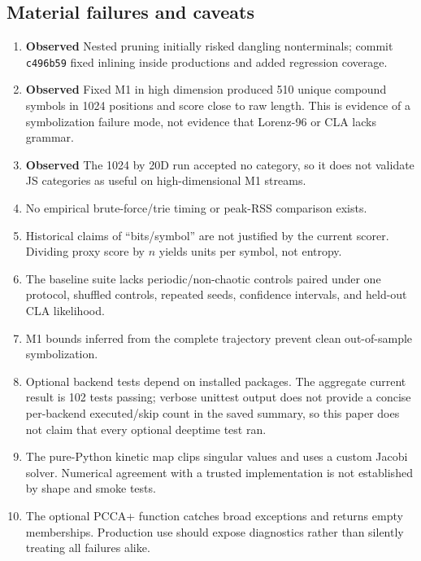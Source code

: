 \documentclass[11pt]{article}
\newcommand{\Observed}{\textbf{Observed}}
\begin{document}
\subsection{Material failures and caveats}
\begin{enumerate}[leftmargin=*]
\item \Observed{} Nested pruning initially risked dangling nonterminals; commit \texttt{c496b59} fixed inlining inside productions and added regression coverage.
\item \Observed{} Fixed M1 in high dimension produced 510 unique compound symbols in 1024 positions and score close to raw length. This is evidence of a symbolization failure mode, not evidence that Lorenz-96 or CLA lacks grammar.
\item \Observed{} The 1024 by 20D run accepted no category, so it does not validate JS categories as useful on high-dimensional M1 streams.
\item No empirical brute-force/trie timing or peak-RSS comparison exists.
\item Historical claims of ``bits/symbol'' are not justified by the current scorer. Dividing proxy score by $n$ yields units per symbol, not entropy.
\item The baseline suite lacks periodic/non-chaotic controls paired under one protocol, shuffled controls, repeated seeds, confidence intervals, and held-out CLA likelihood.
\item M1 bounds inferred from the complete trajectory prevent clean out-of-sample symbolization.
\item Optional backend tests depend on installed packages. The aggregate current result is 102 tests passing; verbose unittest output does not provide a concise per-backend executed/skip count in the saved summary, so this paper does not claim that every optional deeptime test ran.
\item The pure-Python kinetic map clips singular values and uses a custom Jacobi solver. Numerical agreement with a trusted implementation is not established by shape and smoke tests.
\item The optional PCCA+ function catches broad exceptions and returns empty memberships. Production use should expose diagnostics rather than silently treating all failures alike.
\end{enumerate}
\end{document}
